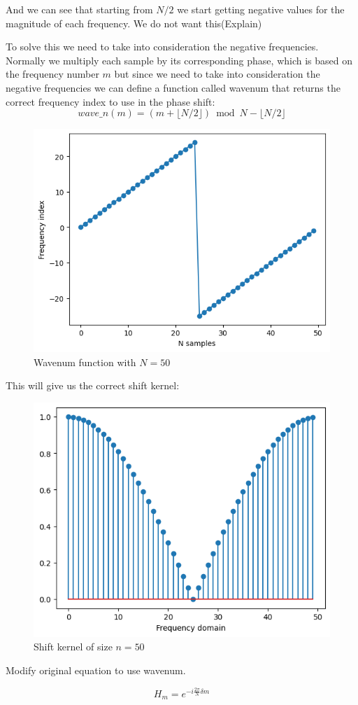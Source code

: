 \documentclass[]{usiinfbachelorproject}
\begin{document}
	And we can see that starting from $N/2$ we start getting negative values for the magnitude of each frequency. We do not want this(Explain)
	
	To solve this we need to take into consideration the negative frequencies.
	Normally we multiply each sample by its corresponding phase, which is based on the frequency number $m$
	but since we need to take into consideration the negative frequencies we can define a function called wavenum that returns the correct frequency index to use in the phase shift:
	\begin{equation*}
		wave\_n(m) = (m + \lfloor N/2 \rfloor ) \bmod N - \lfloor N/2 \rfloor
	\end{equation*}

	\begin{figure}[h]
		\centering
		\includegraphics[width=0.5\columnwidth]{images/wavenum_n50.png}
		\caption{Wavenum function with $N=50$}
	\end{figure}
	
	This will give us the correct shift kernel:
	\begin{figure}[h]
		\centering
		\includegraphics[width=0.5\columnwidth]{images/Results/good_shift_filter.png}
		\caption{Shift kernel of size $n=50$}
	\end{figure}
	
	
	
	Modify original equation to use wavenum.
	
	\begin{equation*}
		H_m = e^{-i \frac{2\pi}{N}  \delta m}
	\end{equation*}
	
\end{document}
